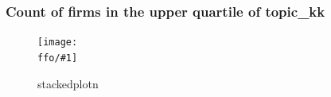 \documentclass{beamer}
\newcommand{\ffo}{dicfullmc10thr10defnob40noa1_4t}
\newcommand{\insertfigure}[2]{
\begin{figure}[h!]
  \centering
  \texttt{[image: \\ffo/\#1]}
  \centering
  \captionsetup{font=scriptsize}
  \caption{#2}
  \label{fig:#1}
\end{figure}
}
\begin{document}
\begin{frame}
\label{slide:count_ntile4kk}
\frametitle{Count of firms in the upper quartile of topic\_kk}
\insertfigure{stackedplot_n}{stackedplotn}
\end{frame}
%
%


			
%			
\end{document}
